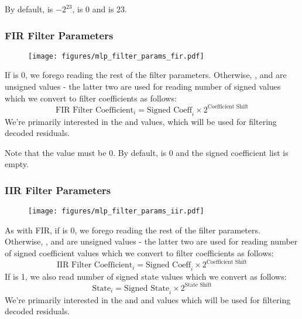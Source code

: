 By default,  is $-2 ^ {23}$,  is 0
and  is 23.

\clearpage

\subsubsection{FIR Filter Parameters}
\begin{figure}[h!]
\texttt{[image: figures/mlp\_filter\_params\_fir.pdf]}
\end{figure}
\par
\noindent
If  is 0, we forego reading the rest of the filter parameters.
Otherwise, ,  and 
are unsigned values - the latter two are used for reading
 number of signed values
which we convert to filter coefficients as follows:
\begin{equation*}
\text{FIR Filter Coefficient}_i = \text{Signed Coeff}_i \times 2 ^ {\text{Coefficient Shift}}
\end{equation*}
We're primarily interested in the  and 
values, which will be used for filtering decoded residuals.

Note that the  value must be 0.  By default,
 is 0 and the signed coefficient list is empty.

\subsubsection{IIR Filter Parameters}
\begin{figure}[h]
\texttt{[image: figures/mlp\_filter\_params\_iir.pdf]}
\end{figure}

As with FIR, if  is 0, we forego reading the rest of the
filter parameters.
Otherwise, ,  and 
are unsigned values - the latter two are used for reading
 number of signed coefficient values
which we convert to filter coefficients as follows:
\begin{equation*}
\text{IIR Filter Coefficient}_i = \text{Signed Coeff}_i \times 2 ^ {\text{Coefficient Shift}}
\end{equation*}
If  is 1, we also read  number of signed state
values which we convert as follows:
\begin{equation*}
\text{State}_i = \text{Signed State}_i \times 2 ^ {\text{State Shift}}
\end{equation*}
We're primarily interested in the  and 
and  values which will be used for filtering decoded residuals.

